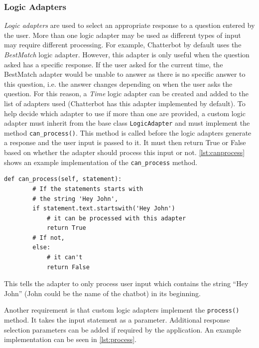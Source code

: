 \documentclass[12pt,a4paper]{article}
\newcommand{\captionstyle}[1] {
    \small{#1}
}
\begin{document}
\subsubsection{Logic Adapters}
\textit{Logic adapters} are used to select an appropriate response to a question entered by the user. More than one logic adapter may be used as different types of input may require different processing. For example, Chatterbot by default uses the \textit{BestMatch} logic adapter. However, this adapter is only useful when the question asked has a specific response. If the user asked for the current time, the BestMatch adapter would be unable to answer as there is no specific answer to this question, i.e. the answer changes depending on when the user asks the question. For this reason, a \textit{Time} logic adapter can be created and added to the list of adapters used (Chatterbot has this adapter implemented by default). To help decide which adapter to use if more than one are provided, a custom logic adapter must inherit from the base class \texttt{LogicAdapter} and must implement the method \texttt{can\_process()}. This method is called before the logic adapters generate a response and the user input is passed to it. It must then return True or False based on whether the adapter should process this input or not. \cref{lst:canprocess} shows an example implementation of the \texttt{can\_process} method.

\begin{lstlisting}[caption={\captionstyle{Example implementation of the \texttt{can\_process()} method. Adapted from \cite{Chatterbot:online}.}}, label={lst:canprocess}]
    def can_process(self, statement):
        # If the statements starts with
        # the string 'Hey John',
        if statement.text.startswith('Hey John')
            # it can be processed with this adapter
            return True
        # If not,
        else:
            # it can't
            return False
\end{lstlisting}

This tells the adapter to only process user input which contains the string \enquote{Hey John} (John could be the name of the chatbot) in its beginning.

Another requirement is that custom logic adapters implement the \texttt{process()} method. It takes the input statement as a parameter. Additional response selection parameters can be added if required by the application. An example implementation can be seen in \cref{lst:process}.
\end{document}

